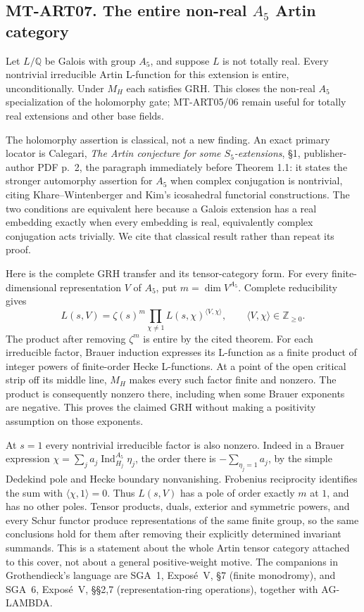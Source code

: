 \documentclass[11pt,a4paper]{article}
\begin{document}
\subsection*{MT-ART07. The entire non-real $A_5$ Artin category}
Let $L/\mathbb Q$ be Galois with group $A_5$, and suppose $L$ is not
totally real. Every nontrivial irreducible Artin L-function for this
extension is entire, unconditionally. Under $M_H$ each satisfies GRH.
This closes the non-real $A_5$ specialization of the holomorphy gate;
MT-ART05/06 remain useful for totally real extensions and other base fields.

The holomorphy assertion is classical, not a new finding. An exact primary
locator is Calegari, \emph{The Artin conjecture for some $S_5$-extensions},
\S1, publisher-author PDF p.~2, the paragraph immediately before
Theorem 1.1: it states the stronger automorphy assertion for $A_5$ when
complex conjugation is nontrivial, citing Khare--Wintenberger and Kim's
icosahedral functorial constructions. The two conditions are equivalent
here because a Galois extension has a real embedding exactly when every
embedding is real, equivalently complex conjugation acts trivially.
We cite that classical result rather than repeat its proof.

Here is the complete GRH transfer and its tensor-category form.
For every finite-dimensional representation $V$ of $A_5$, put
$m=\dim V^{A_5}$. Complete reducibility gives
\[
 L(s,V)=\zeta(s)^m
          \prod_{\chi\ne1}L(s,\chi)^{\langle V,\chi\rangle},
 \qquad \langle V,\chi\rangle\in\mathbb Z_{\ge0}.
\]
The product after removing $\zeta^m$ is entire by the cited theorem.
For each irreducible factor, Brauer induction expresses its L-function
as a finite product of integer powers of finite-order Hecke L-functions.
At a point of the open critical strip off its middle line, $M_H$ makes
every such factor finite and nonzero. The product is consequently nonzero
there, including when some Brauer exponents are negative. This proves
the claimed GRH without making a positivity assumption on those exponents.

At $s=1$ every nontrivial irreducible factor is also nonzero. Indeed in a
Brauer expression $\chi=\sum_j a_j\operatorname{Ind}_{H_j}^{A_5}\eta_j$,
the order there is $-\sum_{\eta_j=1}a_j$, by the simple Dedekind pole and
Hecke boundary nonvanishing. Frobenius reciprocity identifies the sum with
$\langle\chi,1\rangle=0$. Thus $L(s,V)$ has a pole of order exactly $m$
at $1$, and has no other poles. Tensor products, duals, exterior and
symmetric powers, and every Schur functor produce representations of the
same finite group, so the same conclusions hold for them after removing
their explicitly determined invariant summands. This is a statement about
the whole Artin tensor category attached to this cover, not about a
general positive-weight motive. The companions in Grothendieck's language
are SGA~1, Expos\'e~V, \S7 (finite monodromy), and SGA~6, Expos\'e~V,
\S\S2,7 (representation-ring operations), together with AG-LAMBDA.
\end{document}

